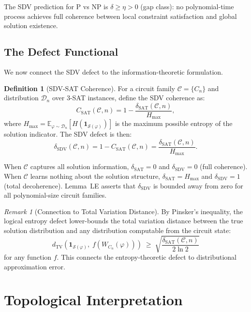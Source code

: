 \documentclass[11pt]{article}
\theoremstyle{definition}
\newtheorem{definition}[theorem]{Definition}
\theoremstyle{remark}
\newtheorem{remark}[theorem]{Remark}
\DeclareMathOperator{\TV}{TV}
\newcommand{\calC}{\mathcal{C}}
\newcommand{\calD}{\mathcal{D}}
\newcommand{\calS}{\mathcal{S}}
\newcommand{\SAT}{\mathrm{SAT}}
\newcommand{\dSAT}{\delta_{\mathrm{SAT}}}
\begin{document}
The SDV prediction for P vs NP is $\delta \geq \eta > 0$ (gap class):
no polynomial-time process achieves full coherence between local constraint
satisfaction and global solution existence.

\subsection{The Defect Functional}

We now connect the SDV defect to the information-theoretic formulation.

\begin{definition}[SDV-SAT Coherence]
\label{def:sdv-sat}
For a circuit family $\calC = \{C_n\}$ and distribution $\calD_n$ over
3-SAT instances, define the SDV coherence as:
\[
  C_{\SAT}(\calC, n) = 1 - \frac{\dSAT(\calC, n)}{H_{\max}},
\]
where $H_{\max} = \mathbb{E}_{\varphi \sim \calD_n}[H(\mathbf{1}_{\calS(\varphi)})]$
is the maximum possible entropy of the solution indicator.
The SDV defect is then:
\[
  \delta_{\mathrm{SDV}}(\calC, n) = 1 - C_{\SAT}(\calC, n) = \frac{\dSAT(\calC, n)}{H_{\max}}.
\]
\end{definition}

When $\calC$ captures all solution information, $\dSAT = 0$ and
$\delta_{\mathrm{SDV}} = 0$ (full coherence).  When $\calC$ learns nothing
about the solution structure, $\dSAT = H_{\max}$ and $\delta_{\mathrm{SDV}} = 1$
(total decoherence).  Lemma~LE asserts that $\delta_{\mathrm{SDV}}$ is bounded
away from zero for all polynomial-size circuit families.

\begin{remark}[Connection to Total Variation Distance]
\label{rem:tv}
By Pinsker's inequality, the logical entropy defect lower-bounds the
total variation distance between the true solution distribution and any
distribution computable from the circuit state:
\[
  d_{\TV}\!\left(\mathbf{1}_{\calS(\varphi)},\; f(W_{C_n}(\varphi))\right)
  \;\geq\; \sqrt{\frac{\dSAT(\calC, n)}{2 \ln 2}}
\]
for any function $f$.  This connects the entropy-theoretic defect to
distributional approximation error.
\end{remark}

\section{Topological Interpretation}
\label{sec:topology}
\end{document}
